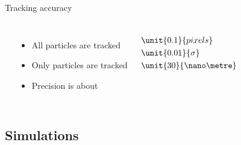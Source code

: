\begin{frame}{Tracking accuracy}
\begin{columns}
	\\
	\begin{itemize}
		\item All particles are tracked
		\item Only particles are tracked
		\item Precision is about
	\end{itemize}
	\begin{align*}
		&\unit{0.1}{pixels}\\
		&\unit{0.01}{\sigma}\\
		&\unit{30}{\nano\metre}
	\end{align*}
	\end{columns}
\end{frame}

\subsection{Simulations}

